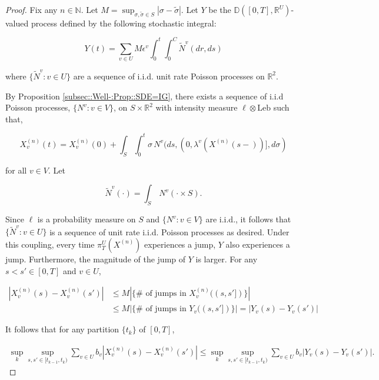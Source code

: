 \documentclass[12pt]{article}
\newcommand{\mb}{\mathbb}
\newcommand{\te}{\text}
\newcommand{\ep}{\epsilon}
\newcommand{\ind}{\hspace{24pt}}
\newcommand{\cad}{\mb{D}}							%
\renewcommand{\v}{v}							%
\renewcommand{\U}{U}							%
\renewcommand{\S}{S}							%
\newcommand{\s}{\sigma}							%
\renewcommand{\b}{b}							%
\newcommand{\ev}{\ep}							%
\newcommand{\T}{T}								%
\renewcommand{\t}{t}							%
\newcommand{\proj}{\pi}							%
\renewcommand{\tt}{s}							%
\newcommand{\ttt}{s'}							%
\newcommand{\X}{X}								%
\newcommand{\vind}[1]{^{#1}}					%
\newcommand{\vsi}[1]{^{#1}}						%
\newcommand{\cind}[1]{_{#1}}					%
\newcommand{\tp}[1]{(#1)}						%
\newcommand{\ts}[1]{_{#1}}						%
\newcommand{\const}{C}							%
\newcommand{\sln}[1]{^{(#1)}}					%
\renewcommand{\ss}{\tilde{\s}}					%
\newcommand{\poiss}{N}							%
\newcommand{\leb}{\te{Leb}}						%
\newcommand{\Sm}{\ell}							%
\newcommand{\rate}{\lambda}						%
\renewcommand{\r}{r}							%
\newcommand{\cconst}{M}							%
\newcommand{\alt}[1]{\widetilde{#1}}			%
\newcommand{\indx}[1]{_{#1}}					%
\newcommand{\XX}{Y}								%
\renewcommand{\it}{k}							%
\begin{document}
\begin{proof}
Fix any \(n \in \mb{N}\). Let \(\cconst = \sup_{\s,\ss \in \S} |\s - \ss|\). Let \(\XX\) be the \(\cad([0,\T],\mb{R}^\U)\)-valued process defined by the following stochastic integral:

\[\XX\tp{\t} = \sum_{\v \in \U}\cconst\ev\vind{\v}\int_0^\t\int_0^{\const}\alt{\poiss}\vind{\v}(d\r, d\tt)\]

where \(\{\alt{\poiss}\vind{\v}:\v \in \U\}\) are a sequence of i.i.d. unit rate Poisson processes on \(\mb{R}^2\). 

\ind By Proposition \ref{subsec::Well-:Prop::SDE=IG}, there exists a sequence of i.i.d Poisson processes, \(\{\poiss\vind{\v}:\v\in V\}\), on \(\S\times\mb{R}^2\) with intensity measure \(\Sm\otimes \leb\) such that,

\[\X\sln{n}\cind{\v}\tp{\t} = \X\sln{n}\cind{\v}\tp{0} + \int_\S\int_0^\t \s\,\poiss\vind{\v}(d\tt,(0,\rate\vind{\v}(\X\sln{n}\tp{\tt-})],d\s)\]

for all \(\v\in V\). Let

\[\alt{\poiss}\vind{\v}(\cdot) = \int_\S\,\poiss\vind{\v}(\cdot\times \S).\]

Since \(\Sm\) is a probability measure on \(\S\) and \(\{\poiss\vind{\v}:\v\in V\}\) are i.i.d., it follows that \(\{\alt{\poiss}\vind{\v}:\v\in \U\}\) is a sequence of unit rate i.i.d. Poisson processes as desired. Under this coupling, every time \(\proj\vsi{\U}\ts{\T}(\X\sln{n})\) experiences a jump, \(\XX\) also experiences a jump. Furthermore, the magnitude of the jump of \(\XX\) is larger. For any \(\tt<\ttt\in [0,\T]\) and \(\v\in \U\),

\begin{align*}
|\X\sln{n}\cind{\v}\tp{\tt} - \X\sln{n}\cind{\v}\tp{\ttt}|&\leq \cconst\left|\{\#\te{ of jumps in }\X\sln{n}\cind{\v}\tp{(\tt,\ttt]}\}\right| \\
&\leq \cconst\left|\{\#\te{ of jumps in }\XX\cind{\v}\tp{(\tt,\ttt]}\}\right| = \left|\XX\cind{\v}\tp{\tt} - \XX\cind{\v}\tp{\ttt}\right|
\end{align*}

It follows that for any partition \(\{\t\indx{\it}\}\) of \([0,\T]\),

\begin{align*}
\sup_\it\sup_{\tt,\ttt \in [\t\indx{\it-1},\t\indx{\it})} \sum_{\v\in \U} \b\cind{\v}|\X\sln{n}\cind{\v}\tp{\tt} - \X\sln{n}\cind{\v}\tp{\ttt}|\leq \sup_\it\sup_{\tt,\ttt \in [\t\indx{\it-1},\t\indx{\it})} \sum_{\v\in \U} \b\cind{\v}|\XX\cind{\v}\tp{\tt} - \XX\cind{\v}\tp{\ttt}|.
\end{align*}


\end{proof}
\end{document}
